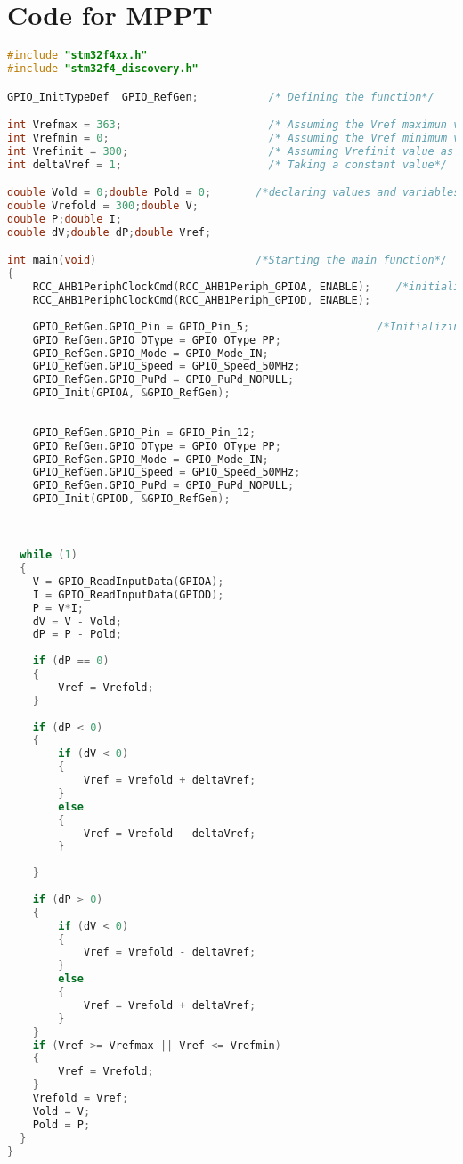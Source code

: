 \section{Code for MPPT}
\begin{lstlisting}[language=C++]
#include "stm32f4xx.h"
#include "stm32f4_discovery.h"

GPIO_InitTypeDef  GPIO_RefGen;           /* Defining the function*/

int Vrefmax = 363;                       /* Assuming the Vref maximun value*/
int Vrefmin = 0;                         /* Assuming the Vref minimum value*/
int Vrefinit = 300;                      /* Assuming Vrefinit value as 300 coz at here MPP occurs*/
int deltaVref = 1;                       /* Taking a constant value*/

double Vold = 0;double Pold = 0;       /*declaring values and variables*/
double Vrefold = 300;double V;
double P;double I;
double dV;double dP;double Vref;

int main(void)                         /*Starting the main function*/
{
	RCC_AHB1PeriphClockCmd(RCC_AHB1Periph_GPIOA, ENABLE);    /*initializing the clock pulses*/
	RCC_AHB1PeriphClockCmd(RCC_AHB1Periph_GPIOD, ENABLE);
	
	GPIO_RefGen.GPIO_Pin = GPIO_Pin_5;                    /*Initializing the pin*/
	GPIO_RefGen.GPIO_OType = GPIO_OType_PP;
	GPIO_RefGen.GPIO_Mode = GPIO_Mode_IN;
	GPIO_RefGen.GPIO_Speed = GPIO_Speed_50MHz;
	GPIO_RefGen.GPIO_PuPd = GPIO_PuPd_NOPULL;
	GPIO_Init(GPIOA, &GPIO_RefGen);
	
	
	GPIO_RefGen.GPIO_Pin = GPIO_Pin_12;
	GPIO_RefGen.GPIO_OType = GPIO_OType_PP;
	GPIO_RefGen.GPIO_Mode = GPIO_Mode_IN;
	GPIO_RefGen.GPIO_Speed = GPIO_Speed_50MHz;
	GPIO_RefGen.GPIO_PuPd = GPIO_PuPd_NOPULL;
	GPIO_Init(GPIOD, &GPIO_RefGen);
    


  while (1)
  {
	V = GPIO_ReadInputData(GPIOA);
	I = GPIO_ReadInputData(GPIOD);
	P = V*I;
	dV = V - Vold;
	dP = P - Pold;
	
	if (dP == 0)
	{
		Vref = Vrefold;
	}
	
	if (dP < 0)
	{
		if (dV < 0)
		{
			Vref = Vrefold + deltaVref;
		}
		else
		{
			Vref = Vrefold - deltaVref;
		}
		
	}
	
	if (dP > 0)
	{
		if (dV < 0)
		{
			Vref = Vrefold - deltaVref;
		}
		else
		{
			Vref = Vrefold + deltaVref;
		}
	}
	if (Vref >= Vrefmax || Vref <= Vrefmin)
	{
		Vref = Vrefold;
	}
	Vrefold = Vref;
	Vold = V;
	Pold = P;
  }
}
\end{lstlisting}



